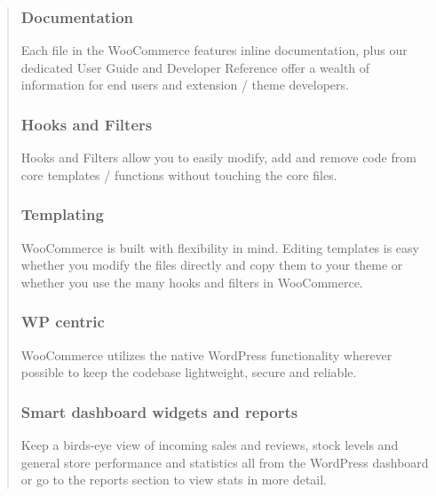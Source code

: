 \documentclass[35pt]{report}
\begin{document}
\begin{quote}
					\subsubsection{Documentation}
					Each file in the WooCommerce features inline documentation, plus our dedicated User Guide and Developer Reference offer a wealth of information for end users and extension / theme developers.

					\subsubsection{Hooks and Filters}
					Hooks and Filters allow you to easily modify, add and remove code from core templates / functions without touching the core files.

					\subsubsection{Templating}
					WooCommerce is built with flexibility in mind. Editing templates is easy whether you modify the files directly and copy them to your theme or whether you use the many hooks and filters in WooCommerce.

					\subsubsection{WP centric}
					WooCommerce utilizes the native WordPress functionality wherever possible to keep the codebase lightweight, secure and reliable.

					\subsubsection{Smart dashboard widgets and reports}
					Keep a birds-eye view of incoming sales and reviews, stock levels and general store performance and statistics all from the WordPress dashboard or go to the reports section to view stats in more detail.


\end{quote}
\end{document}
